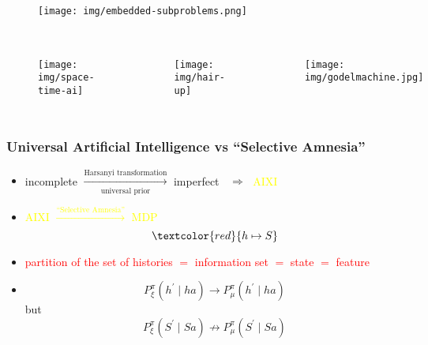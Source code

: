 \documentclass[UTF8,11pt,colorlinks,compress,openany]{beamer}%
\begin{document}
\begin{frame}\frametitle{}
\begin{figure}[H]
\texttt{[image: img/embedded-subproblems.png]}
\end{figure}
\end{frame}

\begin{frame}\frametitle{}
\begin{columns}[onlytextwidth]
	\begin{figure}
		\texttt{[image: img/space-time-ai]}
	\end{figure}\vspace{-5ex}
	\begin{figure}[H]
		\begin{center}
			\texttt{[image: img/hair-up]}
		\end{center}
	\end{figure}
	\begin{figure}
		\texttt{[image: img/godelmachine.jpg]}
	\end{figure}
\end{columns}
\end{frame}

\begin{frame}\frametitle{Universal Artificial Intelligence vs ``Selective Amnesia''}
\begin{itemize}
	\item incomplete $\xrightarrow[\text{universal prior}]{\text{Harsanyi transformation}}$ imperfect $\;\;\Longrightarrow\;$ \textcolor{yellow}{AIXI}
	\item \textcolor{yellow}{AIXI $\xrightarrow{\text{``Selective Amnesia''}}$ MDP}
	\[\textcolor{red}{h\mapsto S}\]
	\item \textcolor{red}{partition of the set of histories $=$ information set $=$ state $=$ feature}
	\item \[P_\xi^\pi(h^\prime\mid ha)\to P_\mu^\pi(h^\prime\mid ha)\]
	but
	\[P_\xi^\pi(S^\prime\mid Sa)\nrightarrow P_\mu^\pi(S^\prime\mid Sa)\]
\end{itemize}
\end{frame}
\end{document}
